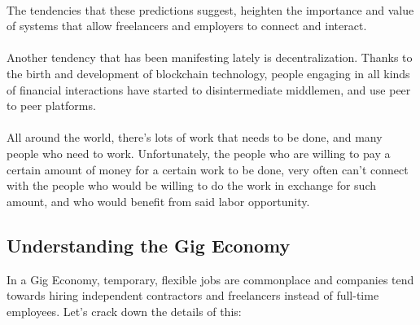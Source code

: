 \documentclass{article}
\begin{document}
\paragraph{}The tendencies that these predictions suggest, heighten the importance and value of systems that allow freelancers and employers to connect and interact.

\paragraph{}Another tendency that has been manifesting lately is decentralization. Thanks to the birth and development of blockchain technology, people engaging in all kinds of financial interactions have started to disintermediate middlemen, and use peer to peer platforms. 

\paragraph{} All around the world, there's lots of work that needs to be done, and many people who need to work. Unfortunately, the people who are willing to pay a certain amount of money for a certain work to be done, very often can't connect with the people who would be willing to do the work in exchange for such amount, and who would benefit from said labor opportunity.

\subsection{Understanding the Gig Economy}
In a Gig Economy, temporary, flexible jobs are commonplace and companies tend towards hiring independent contractors and freelancers instead of full-time employees\cite{gig-economy-investopedia}. Let's crack down the details of this:
\end{document}

